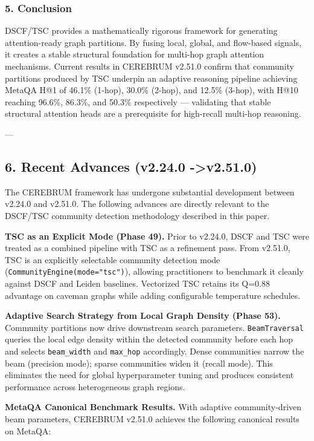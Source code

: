 \subsubsection{5. Conclusion}
DSCF/TSC provides a mathe\-matically rigorous framework for generating attention-ready graph partitions. By fusing local, global, and flow-based signals, it creates a stable structural foundation for multi-hop graph attention mechanisms. Current results in CEREBRUM v2.51.0 confirm that community partitions produced by TSC underpin an adaptive reasoning pipeline achieving MetaQA H@1 of 46.1\% (1-hop), 30.0\% (2-hop), and 12.5\% (3-hop), with H@10 reaching 96.6\%, 86.3\%, and 50.3\% respe\-ctively — validating that stable structural attention heads are a prere\-quisite for high-recall multi-hop reasoning.

---

\subsection{6. Recent Advances (v2.24.0 -\textgreater  v2.51.0)}

The CEREBRUM framework has undergone substantial development between v2.24.0 and v2.51.0. The following advances are directly relevant to the DSCF/TSC community detection methodology described in this paper.

\textbf{TSC as an Explicit Mode (Phase 49).} Prior to v2.24.0, DSCF and TSC were treated as a combined pipeline with TSC as a refinement pass. From v2.51.0, TSC is an explicitly selectable community detection mode (\texttt{CommunityEngine(mode="tsc")}), allowing pract\-itioners to benchmark it cleanly against DSCF and Leiden baselines. Vectorized TSC retains its Q=0.88 advantage on caveman graphs while adding confi\-gurable temperature schedules.

\textbf{Adaptive Search Strategy from Local Graph Density (Phase 53).} Community partitions now drive downstream search parameters. \texttt{BeamTraversal} queries the local edge density within the detected community before each hop and selects \texttt{beam\_width} and \texttt{max\_hop} accordingly. Dense communities narrow the beam (precision mode); sparse communities widen it (recall mode). This eliminates the need for global hyper\-parameter tuning and produces consistent performance across heter\-ogeneous graph regions.

\textbf{MetaQA Canonical Benchmark Results.} With adaptive community-driven beam parameters, CEREBRUM v2.51.0 achieves the following canonical results on MetaQA:

